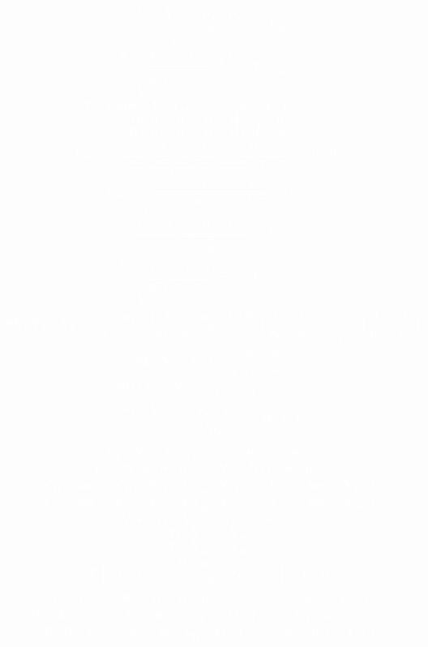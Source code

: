 \documentclass[12pt,portrait,semhelv,semrot]{article}
\begin{document}
\normalsize


\textcolor{white}{
	\textbf{
$$\boldsymbol{\frac{\bar{Y}_1-\bar{Y}_2 - (\mu_1-\mu_2)}{\sqrt{\frac{S_1^2}{n_1}+\frac{S_2^2}{n_2}}} \sim T_{\hat{df}}}$$
$$\boldsymbol{\frac{\bar{Y}_1-\bar{Y}_2 - (\mu_1-\mu_2)}{\sqrt{S_p^2\left(\frac{1}{n_1}+\frac{1}{n_2}\right)}} \sim T_{n_1+n_2-2}}$$
$$\boldsymbol{P-value = P(T_{13}\geq 0.8488|\mu_1 = \mu_2) = 0.2057}$$
$$\boldsymbol{H_0: \mu_1-\mu_2 = 0 \iff H_0: \mu_1 = \mu_2}$$
$$\boldsymbol{H_A: \mu_1-\mu_2 > 0 \iff H_A: \mu_1 > \mu_2}$$
$$\boldsymbol{t_{obs} = \frac{(1.679-1.520)-0}{\sqrt{\frac{(8-1)0.3743^2+(7-1)0.3469^2}{8+7-2}\left(\frac{1}{8}+\frac{1}{7}\right)}} = 0.8488 }$$
$$\boldsymbol{t_{obs} = \frac{(1.679-1.520)-0}{\sqrt{0.3743^2/8+0.3469^2/7}} = 0.8535 }$$
$$\boldsymbol{\frac{\bar{V}_1-\bar{V}_2 - (\mu_1-\mu_2)}{\sqrt{\frac{S_1^2}{n_1}+\frac{S_2^2}{n_2}}} \sim T_{\hat{df}}}$$
$$\boldsymbol{\frac{\bar{V}_1-\bar{V}_2 - (\mu_1-\mu_2)}{\sqrt{S_p^2\left(\frac{1}{n_1}+\frac{1}{n_2}\right)}} \sim T_{n_1+n_2-2}}$$
$$\boldsymbol{SE(\bar{V}_1-\bar{V}_2) = \sqrt{\frac{(n_1-1)S_1^2+(n_2-1)S_2^2}{n_1+n_2-2}\left(\frac{1}{n_1}+\frac{1}{n_2}\right)} = \sqrt{S_p^2\left(\frac{1}{n_1}+\frac{1}{n_2}\right)}}$$
$$\boldsymbol{SE(\bar{V}_1-\bar{V}_2) = \sqrt{\frac{S_1^2}{n_1}+\frac{S^2_2}{n_2}}}$$
$$\boldsymbol{SD(\bar{V}_1-\bar{V}_2) = \sqrt{\sigma^2_1/n_1+ \sigma^2_2/n_2}}$$
$$\boldsymbol{\frac{(\bar{V}_1-\bar{V}_2) - (\mu_1-\mu_2)}{\sqrt{\sigma^2_1/n_1+ \sigma^2_2/n_2}}\sim N(0,1)}$$
$$\boldsymbol{\bar{V}_1-\bar{V}_2 \sim N(\mu_1-\mu_2, \sigma^2_1/n_1+ \sigma^2_2/n_2)}$$
$$\boldsymbol{\bar{V}_1 \sim N(\mu_1,\sigma^2_1/n_1)~~~~~~~\bar{V}_2 \sim N(\mu_2,\sigma^2_2/n_2)}$$
$$\boldsymbol{V_{11} = log_{10}(Y_{11}), V_{12} = log_{10}(Y_{12}), ..., V_{1n_1} = log_{10}(Y_{1n_1})}$$
$$\boldsymbol{V_{21} = log_{10}(Y_{21}), V_{22} = log_{10}(Y_{22}), ..., V_{2n_1} = log_{10}(Y_{2n_2})}$$
$$\boldsymbol{Var\left(\bar{Y_1}-\bar{Y_2}\right)= \sigma_1^2/n_1+\sigma^2_2/n_2}$$
$$\boldsymbol{Y_{11}, Y_{12}, ..., Y_{1n_1}}$$
$$\boldsymbol{Y_{21}, Y_{22}, ..., Y_{2n_2}}$$
$$\boldsymbol{P\left(-t_{n-1,\alpha/2} < \frac{\bar{D} - \mu_D}{S_D/\sqrt{n}} < t_{n-1,\alpha/2}\right) = 1-\alpha}$$
$$\boldsymbol{P\left(-t_{n-1,\alpha/2}S_D/\sqrt{n} < \bar{D} - \mu_D < t_{n-1,\alpha/2}S_D/\sqrt{n}\right) = 1-\alpha}$$
$$\boldsymbol{P\left(-\bar{D}-t_{n-1,\alpha/2}S_D/\sqrt{n} < - \mu_D < -\bar{D}+t_{n-1,\alpha/2}S_D/\sqrt{n}\right) = 1-\alpha}$$
$$\boldsymbol{P\left(\bar{D}+t_{n-1,\alpha/2}S_D/\sqrt{n} >  \mu_D > \bar{D}-t_{n-1,\alpha/2}S_D/\sqrt{n}\right) = 1-\alpha}$$
}}
\end{document}
